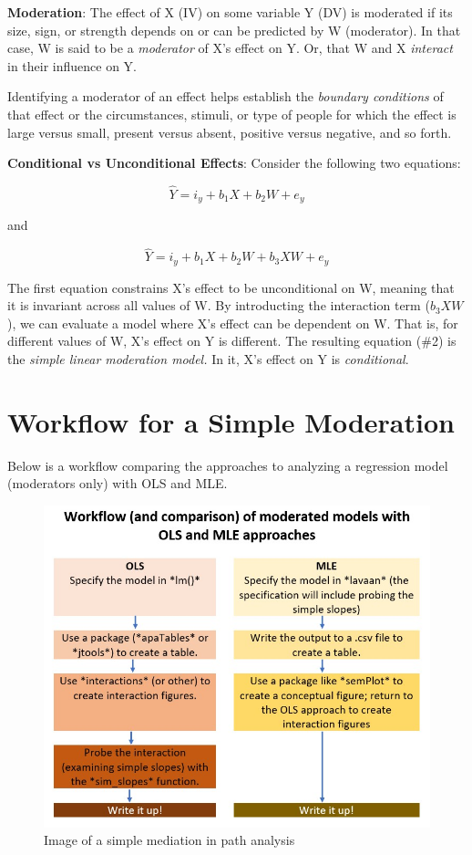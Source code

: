 \documentclass[
  11pt,
]{book}
\begin{document}
\textbf{Moderation}: The effect of X (IV) on some variable Y (DV) is moderated if its size, sign, or strength depends on or can be predicted by W (moderator). In that case, W is said to be a \emph{moderator} of X's effect on Y. Or, that W and X \emph{interact} in their influence on Y.

Identifying a moderator of an effect helps establish the \emph{boundary conditions} of that effect or the circumstances, stimuli, or type of people for which the effect is large versus small, present versus absent, positive versus negative, and so forth.

\textbf{Conditional vs Unconditional Effects}: Consider the following two equations:

\[\hat{Y} = i_{y}+b_{1}X + b_{2}W + e_{y}\]

and

\[\hat{Y} = i_{y}+b_{1}X + b_{2}W + b_{3}XW+ e_{y}\]

The first equation constrains X's effect to be unconditional on W, meaning that it is invariant across all values of W. By introducting the interaction term (\(b_{3}XW\)), we can evaluate a model where X's effect can be dependent on W. That is, for different values of W, X's effect on Y is different. The resulting equation (\#2) is the \emph{simple linear moderation model.} In it, X's effect on Y is \emph{conditional}.

\hypertarget{workflow-for-a-simple-moderation}{%
\section{Workflow for a Simple Moderation}\label{workflow-for-a-simple-moderation}}

Below is a workflow comparing the approaches to analyzing a regression model (moderators only) with OLS and MLE.

\begin{figure}
\centering
\includegraphics{images/SimpleMod/OLS_MLEwrkflow.jpg}
\caption{Image of a simple mediation in path analysis}
\end{figure}
\end{document}
